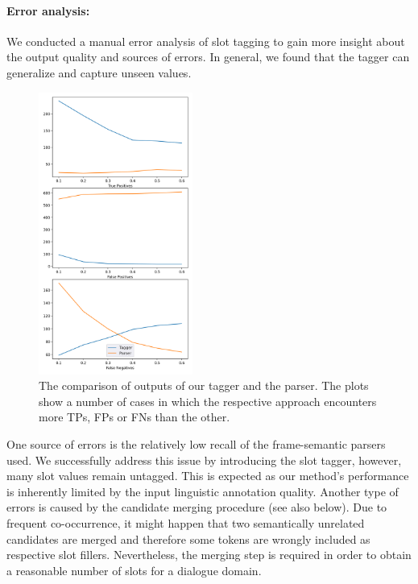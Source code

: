 \paragraph{Error analysis:}
We conducted a manual error analysis of slot tagging to gain more insight about the output quality and sources of errors.
In general, we found that the tagger can generalize and capture unseen values.
\begin{figure}
    \centering
    \includegraphics[width=0.45\textwidth]{images/slots.png}
    \caption{The comparison of outputs of our tagger and the parser. The plots show a number of cases in which the respective approach encounters more TPs, FPs or FNs than the other.}
    \label{fig:tagger_comp}
\end{figure}

One source of errors is the relatively low recall of the frame-semantic parsers used.
We successfully address this issue by introducing the slot tagger, however, many slot values remain untagged.
This is expected as our method's performance is inherently limited by the input linguistic annotation quality.
Another type of errors is caused by the candidate merging procedure (see also below).
Due to frequent co-occurrence, it might happen that two semantically unrelated candidates are merged and therefore some tokens are wrongly included as respective slot fillers.
Nevertheless, the merging step is required in order to obtain a reasonable number of slots for a dialogue domain.

